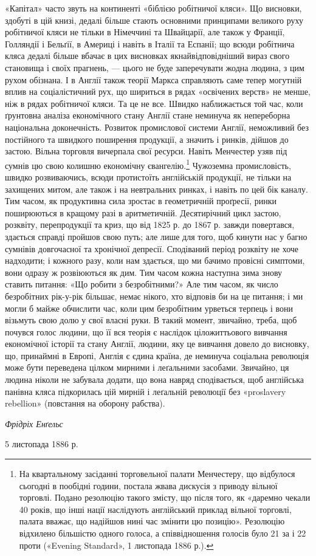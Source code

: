 «Капітал» часто звуть на континенті «біблією робітничої
кляси». Що висновки, здобуті в цій книзі, дедалі більше стають
основними принципами великого руху робітничої кляси не тільки
в Німеччині та Швайцарії, але також у Франції, Голляндії і
Бельґії, в Америці і навіть в Італії та Еспанії; що всюди робітнича
кляса дедалі більше вбачає в цих висновках якнайвідповідніший
вираз свого становища і своїх прагнень, — цього не буде
заперечувати жодна людина, з цим рухом обізнана. І в Англії також
теорії Маркса справляють саме тепер могутній вплив на соціалістичний
рух, що шириться в рядах «освічених верств» не менше,
ніж в рядах робітничої кляси. Та це не все. Швидко наближається
той час, коли ґрунтовна аналіза економічного стану Англії стане
неминуча як непереборна національна доконечність. Розвиток
промислової системи Англії, неможливий без постійного та швидкого
поширення продукції, а значить і ринків, дійшов до застою.
Вільна торговля вичерпала свої ресурси. Навіть Менчестер узяв
під сумнів цю свою колишню економічну євангелію.\footnote{
На квартальному засіданні торговельної палати Менчестеру, що
відбулося сьогодні в пообідні години, постала жвава дискусія з приводу
вільної торговлі. Подано резолюцію такого змісту, що після того, як
«даремно чекали 40 років, що інші нації наслідують англійський приклад
вільної торговлі, палата вважає, що надійшов нині час змінити цю позицію».
Резолюцію відхилено більшістю одного голоса, а співвідношення
голосів було 21 за і 22 проти («Evening Standard», 1 листопада 1886 р.).
} Чужоземна
промисловість, швидко розвиваючись, всюди протистоїть англійській
продукції, не тільки на захищених митом, але також і на
невтральних ринках, і навіть по цей бік каналу. Тим часом, як
продуктивна сила зростає в геометричній проґресії, ринки поширюються
в кращому разі в аритметичній. Десятирічний цикл
застою, розквіту, перепродукції та криз, що від 1825 р. до 1867 р.
завжди повертався, здається справді пройшов свою путь; але
лише для того, щоб кинути нас у багно сумнівів довгочасної та
хронічної депресії. Сподіваний період розквіту не хоче надходити;
і кожного разу, коли нам здається, що ми бачимо провісні
симптоми, вони одразу ж розвіюються як дим. Тим часом  кожна
наступна зима знову ставить питання: «Що робити з безробітними?»
Але тим часом, як число безробітних рік-у-рік більшає,
немає нікого, хто відповів би на це питання; і ми могли б майже
обчислити час, коли цим безробітним урветься терпець і вони
візьмуть свою долю у свої власні руки. В такий момент, звичайно,
треба, щоб почувся голос людини, що її вся теорія є наслідок
ціложиттьового вивчання економічної історії та стану Англії,
людини, яку це вивчання довело до висновку, що, принаймні в
Европі, Англія є єдина країна, де неминуча соціальна революція
може бути переведена цілком мирними і леґальними засобами.
Звичайно, ця людина ніколи не забувала додати, що вона навряд
сподівається, щоб англійська панівна кляса підкорилась цій
мирній і леґальній революції без «proslavery rebellion» (повстання
на оборону рабства).

\begin{flushright}
\emph{Фрідріх Енґельс}
\end{flushright}

{\small 5 листопада 1886 р.}
